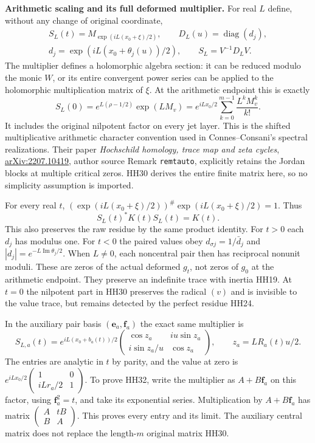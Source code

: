 \documentclass[11pt,a4paper]{article}
\theoremstyle{definition}\newtheorem{definition}[theorem]{Definition}
\newcommand{\B}{\mathbb B}\newcommand{\N}{\mathbb N}
\begin{document}
\HH\textbf{Arithmetic scaling and its full deformed multiplier.}
For real $L$ define, without any change of original coordinate,
\[
 \begin{gathered}
 S_L(t)=M_{\exp(iL(x_0+\xi)/2)},\qquad
 D_L(u)=\operatorname{diag}(d_j),\\
 d_j=\exp(iL(x_0+\theta_j(u))/2),\qquad
 S_L=V^{-1}D_LV .
 \end{gathered}
 \tag{HH29}\label{hh:scaling}
\]
The multiplier defines a holomorphic algebra section: it can be
reduced modulo the monic $W$, or its entire convergent power series
can be applied to the holomorphic multiplication matrix of $\xi$.
At the arithmetic endpoint this is exactly
\[
 S_L(0)=e^{L(\rho-1/2)}\exp(LM_v)
  =e^{iLx_0/2}\sum_{k=0}^{m-1}\frac{L^kM_v^k}{k!}.
 \tag{HH30}\label{hh:arithmetic-scaling}
\]
It includes the original nilpotent factor on every jet layer.
This is the shifted multiplicative arithmetic character convention
used in Connes--Consani's spectral realizations. Their paper
\emph{Hochschild homology, trace map and zeta cycles},
\href{https://arxiv.org/abs/2207.10419}{arXiv:2207.10419},
author source Remark \texttt{remtauto}, explicitly retains the
Jordan blocks at multiple critical zeros. HH30 derives the entire
finite matrix here, so no simplicity assumption is imported.

For every real $t$, $(\exp(iL(x_0+\xi)/2))^\#
\exp(iL(x_0+\xi)/2)=1$. Thus
\[
 S_L(t)^*K(t)S_L(t)=K(t).
 \tag{HH31}\label{hh:scaling-isometry}
\]
This also preserves the raw residue by the same product identity.
For $t>0$ each $d_j$ has modulus one.
For $t<0$ the paired values obey
$d_{\sigma j}=1/\bar d_j$ and
$|d_j|=e^{-L\operatorname{Im}\theta_j/2}$.
When $L\ne0$, each noncentral pair then has reciprocal nonunit
moduli. These are zeros of the actual deformed $g_t$, not zeros of
$g_0$ at the arithmetic endpoint. They preserve an indefinite trace
with inertia HH19. At $t=0$ the nilpotent part in HH30 preserves the
radical $(v)$ and is invisible to the value trace, but remains
detected by the perfect residue HH24.

In the auxiliary pair basis $(\mathbf e_a,\mathbf f_a)$ the exact
same multiplier is
\[
 S_{L,a}(t)=e^{iL(x_0+b_a(t))/2}
 \begin{pmatrix}
  \cos z_a&i u\sin z_a\\
  i\sin z_a/u&\cos z_a
 \end{pmatrix},
 \qquad z_a=L R_a(t)u/2 .
 \tag{HH32}\label{hh:scaling-pair}
\]
The entries are analytic in $t$ by parity, and the value at zero is
$e^{iLx_0/2}\left(\begin{smallmatrix}1&0\\iLr_a/2&1\end{smallmatrix}\right)$.
To prove HH32, write the multiplier as $A+B\mathbf f_a$ on this
factor, using $\mathbf f_a^2=t$, and take its exponential series.
Multiplication by $A+B\mathbf f_a$ has matrix
$\left(\begin{smallmatrix}A&tB\\B&A\end{smallmatrix}\right)$.
This proves every entry and its limit. The auxiliary central matrix
does not replace the length-$m$ original matrix HH30.
\end{document}
